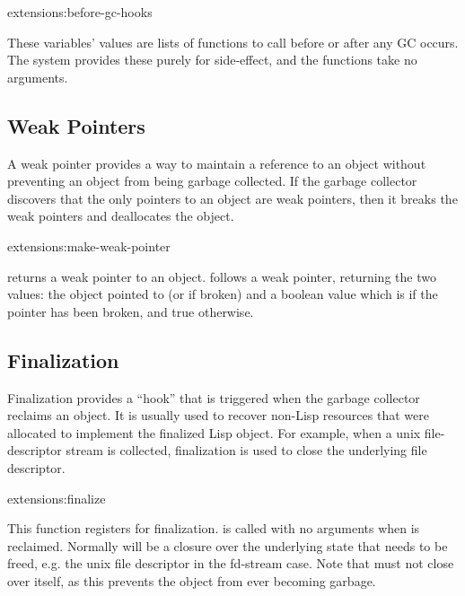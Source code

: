 \begin{defvar}{extensions:}{before-gc-hooks}
  
  These variables' values are lists of functions to call before or
  after any GC occurs.  The system provides these purely for
  side-effect, and the functions take no arguments.
\end{defvar}


\subsection{Weak Pointers}

A weak pointer provides a way to maintain a reference to an object
without preventing an object from being garbage collected.  If the
garbage collector discovers that the only pointers to an object are
weak pointers, then it breaks the weak pointers and deallocates the
object.

\begin{defun}{extensions:}{make-weak-pointer}{}
  
   returns a weak pointer to an object.
   follows a weak pointer, returning the two
  values: the object pointed to (or \false{} if broken) and a boolean
  value which is \false{} if the pointer has been broken, and true
  otherwise.
\end{defun}


\subsection{Finalization}

Finalization provides a ``hook'' that is triggered when the garbage
collector reclaims an object.  It is usually used to recover non-Lisp
resources that were allocated to implement the finalized Lisp object.
For example, when a unix file-descriptor stream is collected,
finalization is used to close the underlying file descriptor.

\begin{defun}{extensions:}{finalize}{}
  
  This function registers  for finalization.
   is called with no arguments when  is
  reclaimed.  Normally  will be a closure over the
  underlying state that needs to be freed, e.g. the unix file
  descriptor in the fd-stream case.  Note that  must not
  close over  itself, as this prevents the object from
  ever becoming garbage.
\end{defun}

